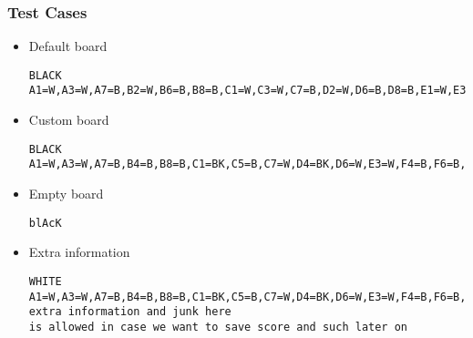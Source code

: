 \documentclass{article}
\begin{document}
\subsubsection*{Test Cases}
\begin{itemize}
\item Default board\hfill
\begin{lstlisting}
BLACK
A1=W,A3=W,A7=B,B2=W,B6=B,B8=B,C1=W,C3=W,C7=B,D2=W,D6=B,D8=B,E1=W,E3=W,E7=B,F2=W,F6=B,F8=B,G1=W,G3=W,G7=B,H2=W,H6=B,H8=B"
\end{lstlisting}

\item Custom board\hfill 
\begin{lstlisting}
BLACK
A1=W,A3=W,A7=B,B4=B,B8=B,C1=BK,C5=B,C7=W,D4=BK,D6=W,E3=W,F4=B,F6=B,F8=WK,G1=W,G3=W,G5=W,G7=WK,H6=B
\end{lstlisting}

\item Empty board\hfill 
\begin{lstlisting}
blAcK

\end{lstlisting}

\item Extra information\hfill 
\begin{lstlisting}
WHITE
A1=W,A3=W,A7=B,B4=B,B8=B,C1=BK,C5=B,C7=W,D4=BK,D6=W,E3=W,F4=B,F6=B,F8=WK,G1=W,G3=W,G5=W,G7=WK,H6=B
extra information and junk here
is allowed in case we want to save score and such later on

\end{lstlisting}
\end{itemize}
\end{document}
